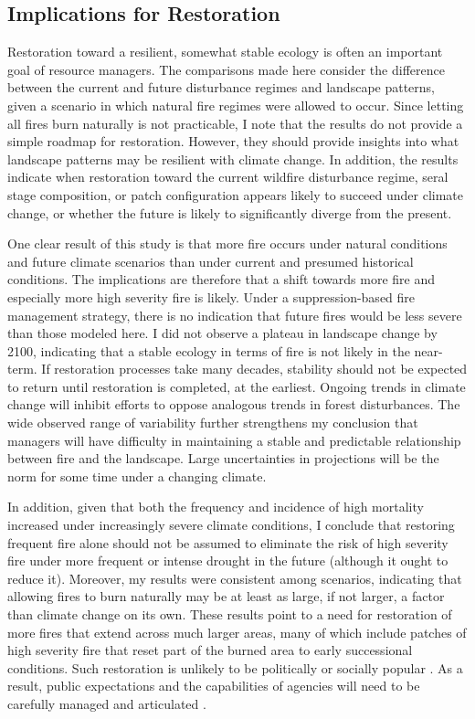 \subsection*{Implications for Restoration}

Restoration toward a resilient, somewhat stable ecology is often an important goal of resource managers. The comparisons made here consider the difference between the current and future disturbance regimes and landscape patterns, given a scenario in which natural fire regimes were allowed to occur. Since letting all fires burn naturally is not practicable, I note that the results do not provide a simple roadmap for restoration. However, they should provide insights into what landscape patterns may be resilient with climate change. In addition, the results indicate when restoration toward the current wildfire disturbance regime, seral stage composition, or patch configuration appears likely to succeed under climate change, or whether the future is likely to significantly diverge from the present. 

One clear result of this study is that more fire occurs under natural conditions and future climate scenarios than under current and presumed historical conditions. The implications are therefore that a shift towards more fire and especially more high severity fire is likely. Under a suppression-based fire management strategy, there is no indication that future fires would be less severe than those modeled here. I did not observe a plateau in landscape change by 2100, indicating that a stable ecology in terms of fire is not likely in the near-term. If restoration processes take many decades, stability should not be expected to return until restoration is completed, at the earliest. Ongoing trends in climate change will inhibit efforts to oppose analogous trends in forest disturbances. The wide observed range of variability further strengthens my conclusion that managers will have difficulty in maintaining a stable and predictable relationship between fire and the landscape. Large uncertainties in projections will be the norm for some time under a changing climate. 

In addition, given that both the frequency and incidence of high mortality increased under increasingly severe climate conditions, I conclude that restoring frequent fire alone should not be assumed to eliminate the risk of high severity fire under more frequent or intense drought in the future (although it ought to reduce it). Moreover, my results were consistent among scenarios, indicating that allowing fires to burn naturally may be at least as large, if not larger, a factor than climate change on its own. These results point to a need for restoration of more fires that extend across much larger areas, many of which include patches of high severity fire that reset part of the burned area to early successional conditions. Such restoration is unlikely to be politically or socially popular \citep{Stephens2010,Stephens2013}. As a result, public expectations and the capabilities of agencies will need to be carefully managed and articulated \citep{Keeley2000}. 

